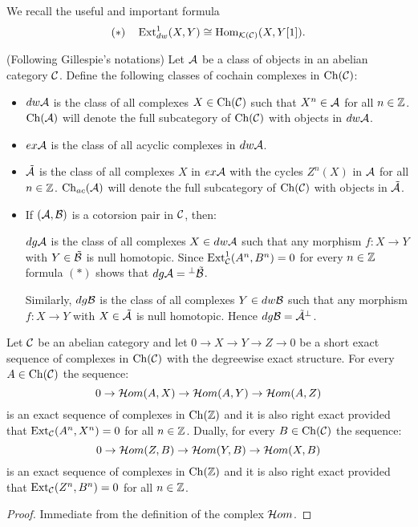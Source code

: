 We recall the useful and important formula
\[(\ast)\quad \operatorname{Ext}^1_{dw}(X, Y) \cong \operatorname{Hom}_{\mathcal{K}(\mathcal{C})}(X,Y[1]).\] %
%
%
\begin{nota}\label{N:notation} (Following Gillespie's notations) Let $\mathcal{A}$ be a class of objects in an abelian category $\mathcal{C}$.
 Define the following classes of cochain
  complexes in $\mathrm{Ch}(\mathcal{C})$:

  \begin{itemize}
    \item
      $dw\mathcal{A}$ is the class of all complexes $X\in\mathrm{Ch}(\mathcal{C})$
      such that $X^n\in\mathcal{A}$ for all $n\in\mathbb{Z}$.  $\mathrm{Ch}(\mathcal{A})$ will denote the full subcategory of  $\mathrm{Ch}(\mathcal{C})$ with objects in $dw \mathcal{A}$.
       \item
      $ex\mathcal{A}$ is the class of all acyclic complexes in $dw\mathcal{A}$.
       \item
      $\tilde{\mathcal{A}}$ is the class of all complexes $X$ in $
      ex\mathcal{A}$ with the cycles $Z^n(X)$ in $\mathcal{A}$ for all $n\in \mathbb{Z}$.
   $\mathrm{Ch}_{ac}(\mathcal{A})$ will denote the full subcategory of  $\mathrm{Ch}(\mathcal{C})$ with objects in $\tilde{\mathcal{A}}$.


    \item  If $(\mathcal{A}, \mathcal{B})$ is a cotorsion pair in $\mathcal{C}$, then:

      $dg\mathcal{A}$ is the class of all complexes $X\in dw\mathcal{A}$
      such that  any morphism
      $f:X\to Y$ with $Y\in\tilde {\mathcal{B}}$ is null homotopic. Since $\operatorname{Ext}^1_{\mathcal{C}}(A^n, B^n)=0$ for every $n\in \mathbb{Z}$ formula $(\ast)$ shows that $dg\mathcal{A}={}^\perp{} \tilde {\mathcal{B}}$.

      Similarly, $dg\mathcal{B}$ is the class of all complexes $Y \in dw\mathcal{B}$
      such that  any morphism
      $f:X\to Y$ with $X\in\tilde{\mathcal{A}}$  is null homotopic. Hence $dg\mathcal{B}=\tilde{\mathcal{A}}{}^\perp{}$.
  \end{itemize}
\end{nota}
%
%
%
%
%
\begin{lem}\label{L:HOM} Let $\mathcal{C}$ be an abelian category and let $0\to X\to Y\to Z\to 0$ be a short exact sequence of complexes in $\mathrm{Ch}(\mathcal{C})$ with the degreewise exact structure. For every $A\in \mathrm{Ch}(\mathcal{C})$ the sequence:
\[0\to \mathcal{H}\mathnormal{om}(A, X)\to  \mathcal{H}\mathnormal{om}(A, Y)\to \mathcal{H}\mathnormal{om}(A, Z)\]
is an exact sequence of complexes in $\mathrm{Ch}(\mathbb{Z})$ and it is also right exact provided that $\operatorname{Ext}_{\mathcal{C}}(A^n, X^n)=0$ for all $n\in \mathbb{Z}$.
 Dually, for every $B\in \mathrm{Ch}(\mathcal{C})$ the sequence:
\[0\to \mathcal{H}\mathnormal{om}(Z, B)\to  \mathcal{H}\mathnormal{om}(Y, B)\to \mathcal{H}\mathnormal{om}(X, B)\]
is an exact sequence of complexes in $\mathrm{Ch}(\mathbb{Z})$ and it is also right exact provided that $\operatorname{Ext}_{\mathcal{C}}(Z^n, B^n)=0$ for all $n\in \mathbb{Z}$.
\end{lem}
\begin{proof} Immediate from the definition of the complex $\mathcal{H}\mathnormal{om}$.
\end{proof}
%
%
